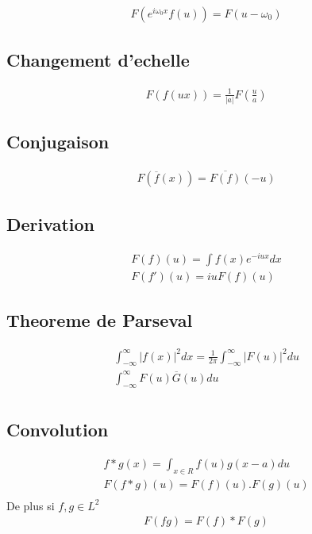 \documentclass[a4paper,11pt]{article}
\begin{document}
\begin{align*}
F(e^{i\omega_0 x} f(u))    = F (u - \omega_0)
\end{align*}

\subsection{Changement d'echelle}
\begin{align*}
  F(f(ux)) = \frac{1}{|a|} F(\frac{u}{a})
\end{align*}

\subsection{Conjugaison}
\begin{align*}
  F(\overline{f}(x)) = \overline{F(f)}(-u)
\end{align*}

\subsection{Derivation}
\begin{align*}
  F(f)(u) = \int f(x)e^{-iux} dx\\
  F(f')(u) = i u F(f)(u)
\end{align*}

\subsection{Theoreme de Parseval}

\begin{align*}
  \int_{-\infty}^{\infty} |f(x)|^2 dx = \frac{1}{2\pi} \int_{-\infty}^{\infty} |F(u)|^2 du\\
  \int_{-\infty}^{\infty} F(u)\overline{G}(u) du\\
\end{align*}

\subsection{Convolution}

\begin{align*}
  f * g(x) = \int_{x \in R} f(u) g(x - a) du\\
  F(f * g) (u) = F(f)(u) . F(g)(u)\\
\end{align*}
De plus si $f,g \in L^2$
\begin{align*}
  F(fg) = F(f) * F(g)
\end{align*}
\end{document}
